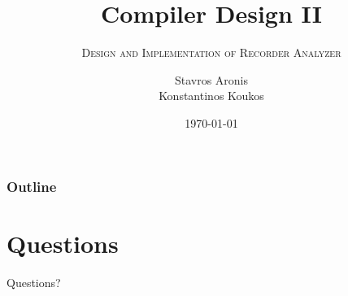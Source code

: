 \documentclass{beamer}
\title{Compiler Design II}
\subtitle{\textsc{Design and Implementation of Recorder Analyzer}}
\author[Aronis \& Koukos]{Stavros Aronis \\ Konstantinos Koukos}
\institute[Uppsala University]
{
\textsc{\Large Uppsala University}\\[0.1cm]
\textsc{\Large Department of Information Technology}\\[2.0cm]
\vfill
}
\date{\today}
\begin{document}
\begin{frame}
\titlepage
\end{frame}

\begin{frame}
\frametitle{Outline}
\tableofcontents[hideallsubsections]
\end{frame}











\section{Questions}
\begin{frame}
\begin{block}{}
\begin{center}
\Huge Questions?
\end{center}
\end{block}
\end{frame}
\end{document}

